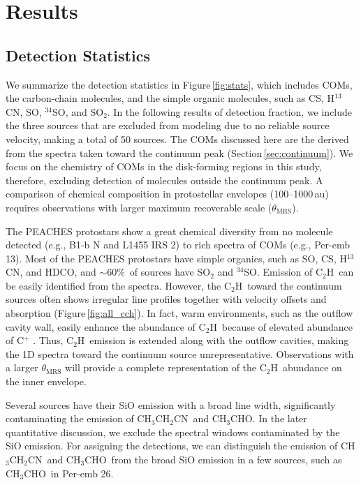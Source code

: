 \documentclass[twocolumn]{aastex62}
\newcommand{\htcn}{\mbox{H$^{13}$CN}}
\newcommand{\acetaldehyde}{\mbox{CH$_{3}$CHO}}
\newcommand{\ethylcyanide}{\mbox{CH$_{3}$CH$_{2}$CN}}
\newcommand{\cch}{\mbox{C$_2$H}}
\begin{document}
\section{Results}
\subsection{Detection Statistics}
We summarize the detection statistics in Figure\,\ref{fig:stats}, which includes COMs, the carbon-chain molecules, and the simple organic molecules, such as CS, \htcn, SO, $^{34}$SO, and SO$_{2}$.  In the following results of detection fraction, we include the three sources that are excluded from modeling due to no reliable source velocity, making a total of 50 sources.  The COMs discussed here are the derived from the spectra taken toward the continuum peak (Section\,\ref{sec:continuum}).  We focus on the chemistry of COMs in the disk-forming regions in this study, therefore, excluding detection of molecules outside the continuum peak.  A comparison of chemical composition in protostellar envelopes (100--1000\,au) requires observations with larger maximum recoverable scale ($\theta_\text{MRS}$).

The PEACHES protostars show a great chemical diversity from no molecule detected (e.g., B1-b N and L1455 IRS 2) to rich spectra of COMs (e.g., Per-emb 13).  Most of the PEACHES protostars have simple organics, such as SO, CS, \htcn, and HDCO, and $\sim 60$\%\ of sources have SO$_{2}$ and $^{34}$SO.  Emission of \cch\ can be easily identified from the spectra.  However, the \cch\ toward the continuum sources often shows irregular line profiles together with velocity offsets and absorption (Figure\,\ref{fig:all_cch}).  In fact, warm environments, such as the outflow cavity wall, easily enhance the abundance of \cch\ because of elevated abundance of C$^{+}$ \citep[e.g., ][]{2018ApJ...864...76Z,2019ApJ...873L..21I}.  Thus, \cch\ emission is extended along with the outflow cavities, making the 1D spectra toward the continuum source unrepresentative.  Observations with a larger $\theta_\text{MRS}$ will provide a complete representation of the \cch\ abundance on the inner envelope.

Several sources have their SiO emission with a broad line width, significantly contaminating the emission of \ethylcyanide\ and \acetaldehyde.  In the later quantitative discussion, we exclude the spectral windows contaminated by the SiO emission.  For assigning the detections, we can distinguish the emission of \ethylcyanide\ and \acetaldehyde\ from the broad SiO emission in a few sources, such as \acetaldehyde\ in Per-emb 26.
\end{document}
